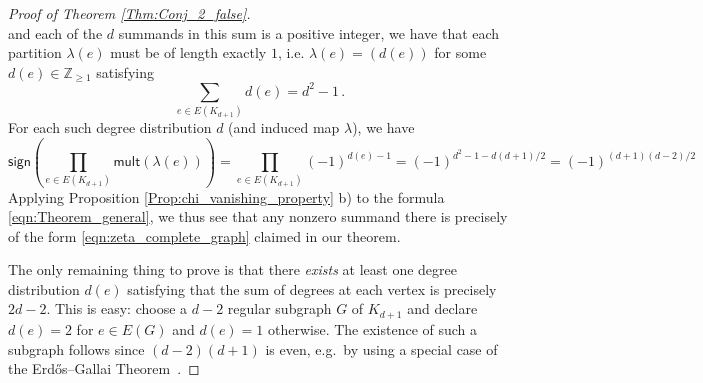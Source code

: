 \documentclass[authorcolumns,numberwithinsect]{no-lipics-v2022}
\begin{document}
\begin{proof}[Proof of Theorem \ref{Thm:Conj_2_false}]
\[\]
and each of the $d$ summands in this sum is a positive integer, we have that each partition $\lambda(e)$ must be of length exactly $1$, i.e. $\lambda(e)=(d(e))$ for some $d(e) \in \mathbb{Z}_{\geq 1}$ satisfying 
$$\sum_{e \in E(K_{d+1})} d(e) = d^2 -1\,.$$
For each such degree distribution $d$ (and induced map $\lambda$), we have
\[
\mathsf{sign}\left(\prod_{e \in E(K_{d+1})} \mathsf{mult}(\lambda(e)) \right) = \prod_{e \in E(K_{d+1})} (-1)^{d(e)-1} = (-1)^{d^2-1 - d(d+1)/2} = (-1)^{(d+1)(d-2)/2}
\]
Applying Proposition \ref{Prop:chi_vanishing_property} b) to the formula 
\eqref{eqn:Theorem_general}, we thus see that any nonzero summand there is precisely of the form \eqref{eqn:zeta_complete_graph} claimed in our theorem. 

The only remaining thing to prove is that there \emph{exists} at least one degree distribution $d(e)$ satisfying that the sum of degrees at each vertex is precisely $2d-2$. This is easy: choose a $d-2$ regular subgraph $G$ of $K_{d+1}$ and declare $d(e)=2$ for $e \in E(G)$ and $d(e)=1$ otherwise. The existence of such a subgraph follows since $(d-2)(d+1)$ is even,  e.g.\ by using a special case of the Erdős–Gallai Theorem~\cite{ErdosG60,Choudum86}.
\end{proof}
\end{document}
